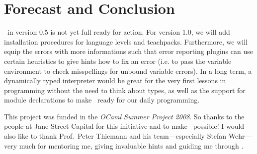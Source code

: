
\section{Forecast and Conclusion}

\easyocaml\ in version 0.5 is not yet full ready for action. For version 
1.0, we will add installation procedures for language levels and 
teachpacks.
Furthermore, we will equip the errors with more informations 
such that error reporting plugins can use certain heuristics to give 
hints how to fix an error (i.e. to pass the variable environment to check
misspellings for unbound variable errors).
In a long term, a dynamically typed interpreter would be great for the very
first lessons in programming without the need to think about types, as well as
the support for module declarations to make \easyocaml\ ready for our daily
programming.


This project was funded in the \emph{OCaml Summer Project 2008}.
So thanks to the people at Jane Street Capital for this initiative and to
make \easyocaml\ possible!
I would also like to thank Prof.\ Peter Thiemann and his team---especially
Stefan Wehr---very much for mentoring me, giving invaluable hints and guiding me
through \easyocaml.

